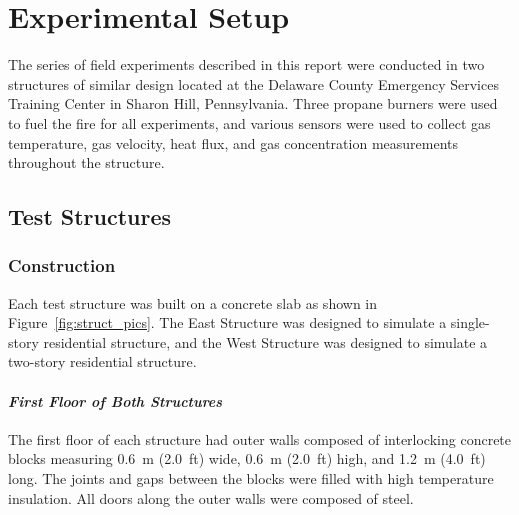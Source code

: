 
\renewcommand{\thechapter}{2}

\chapter{Experimental Setup}
\label{chap:exp_setup}
The series of field experiments described in this report were conducted in two structures of similar design located at the Delaware County Emergency Services Training Center in Sharon Hill, Pennsylvania. Three propane burners were used to fuel the fire for all experiments, and various sensors were used to collect gas temperature, gas velocity, heat flux, and gas concentration measurements throughout the structure.

\section{Test Structures}

\subsection{Construction}
Each test structure was built on a concrete slab as shown in Figure~\ref{fig:struct_pics}. The East Structure was designed to simulate a single-story residential structure, and the West Structure was designed to simulate a two-story residential structure.

\subsubsection*{\textit{First Floor of Both Structures}}
The first floor of each structure had outer walls composed of interlocking concrete blocks measuring 0.6~m (2.0~ft) wide, 0.6~m (2.0~ft) high, and 1.2~m (4.0~ft) long. The joints and gaps between the blocks were filled with high temperature insulation. All doors along the outer walls were composed of steel.

